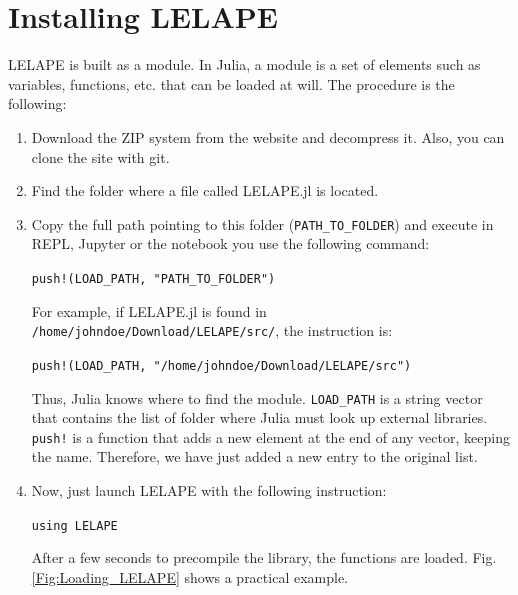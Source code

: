 \section{Installing LELAPE}
LELAPE is built as a module. In Julia, a module is a set of elements such as variables, functions, etc. that can be loaded at will. The procedure is the following:
%
\begin{enumerate}
	\item Download the ZIP system from the website and decompress it. Also, you can clone the site with git.
	\item Find the folder where a file called LELAPE.jl is located.
	\item Copy the full path pointing to this folder (\texttt{PATH\_TO\_FOLDER}) and execute in REPL, Jupyter or the notebook you use the following command:
	
	\vspace{1mm}
	\begin{center}
		\texttt{push!(LOAD\_PATH, "PATH\_TO\_FOLDER")}
	\end{center}
	\vspace{1mm}	
	
	For example, if LELAPE.jl is found in \texttt{/home/johndoe/Download/LELAPE/src/}, the instruction is:
		
	\vspace{1mm}
	\begin{center}
		\texttt{push!(LOAD\_PATH, "/home/johndoe/Download/LELAPE/src")}
	\end{center}
	\vspace{1mm}	
	
	Thus, Julia knows where to find the module. \texttt{LOAD\_PATH} is a string vector that contains the list of folder where Julia must look up external libraries. \texttt{push!} is a function that adds a new element at the end of any vector, keeping the name. Therefore, we have just added a new entry to the original list.
	\item Now, just launch LELAPE with the following instruction:
		
	\vspace{1mm}
	\begin{center}
		\texttt{using LELAPE}
	\end{center}
	\vspace{1mm}	
		
	After a few seconds to precompile the library, the functions are loaded. Fig. \ref{Fig:Loading_LELAPE} shows a practical example.
\end{enumerate}

